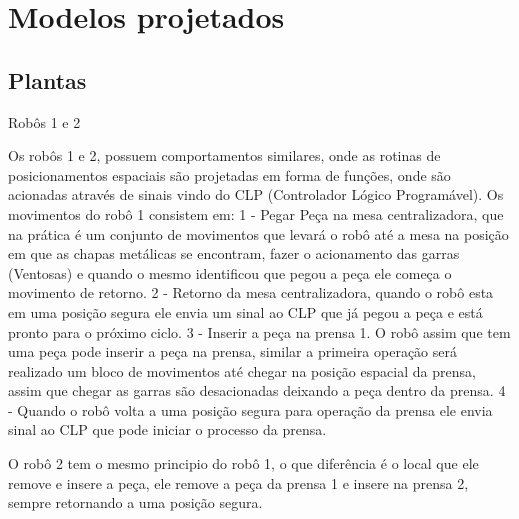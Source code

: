 \section{Modelos projetados}
\subsection{Plantas}
Robôs 1 e 2

Os robôs 1 e 2, possuem comportamentos similares, onde as rotinas de posicionamentos espaciais são projetadas em forma de funções, onde são acionadas através de sinais vindo do CLP (Controlador Lógico Programável). Os movimentos do robô 1 consistem em: 
1 - Pegar Peça na mesa centralizadora, que na prática é um conjunto de movimentos que levará o robô até a mesa na posição em que as chapas metálicas se encontram, fazer o acionamento das garras (Ventosas) e quando o mesmo identificou que pegou a peça ele começa o movimento de retorno. 
2 - Retorno da mesa centralizadora, quando o robô esta em uma posição segura ele envia um sinal ao CLP que já pegou a peça e está pronto para o próximo ciclo.
3 - Inserir a peça na prensa 1. O robô assim que tem uma peça pode inserir a peça na prensa, similar a primeira operação será realizado um bloco de movimentos até chegar na posição espacial da prensa, assim que chegar as garras são desacionadas deixando a peça dentro da prensa. 
4 - Quando o robô volta a uma posição segura para operação da prensa ele envia sinal ao CLP que pode iniciar o processo da prensa. 

O robô 2 tem o mesmo principio do robô 1, o que diferência é o local que ele remove e insere a peça, ele remove a peça da prensa 1 e insere na prensa 2, sempre retornando a uma posição segura.

